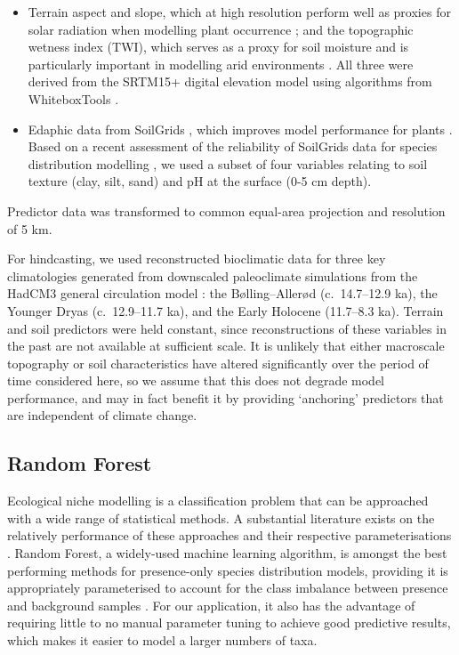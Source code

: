 \documentclass[
  authoryear,
  preprint]{elsarticle}
\providecommand{\tightlist}{%
  \setlength{\itemsep}{0pt}\setlength{\parskip}{0pt}}\usepackage{longtable,booktabs,array}
\begin{document}
\begin{itemize}
\tightlist
\item
  Terrain aspect and slope, which at high resolution perform well as
  proxies for solar radiation when modelling plant occurrence
  \citep{AustinVanNiel2011, LeempoelEtAl2015}; and the topographic
  wetness index (TWI), which serves as a proxy for soil moisture and is
  particularly important in modelling arid environments
  \citep{KopeckyCizkova2010, CamposEtAl2016, DiVirgilioEtAl2018}. All
  three were derived from the SRTM15+ digital elevation model using
  algorithms from WhiteboxTools \citep{Lindsay2016}.
\end{itemize}

\begin{itemize}
\tightlist
\item
  Edaphic data from SoilGrids \citep{HenglEtAl2014, HenglEtAl2017},
  which improves model performance for plants
  \citep{DubuisEtAl2013, ModEtAl2016, VelazcoEtAl2017}. Based on a
  recent assessment of the reliability of SoilGrids data for species
  distribution modelling \citep{MillerEtAl2024}, we used a subset of
  four variables relating to soil texture (clay, silt, sand) and pH at
  the surface (0-5 cm depth).
\end{itemize}

Predictor data was transformed to common equal-area projection and
resolution of 5 km.

For hindcasting, we used reconstructed bioclimatic data for three key
climatologies generated from downscaled paleoclimate simulations from
the HadCM3 general circulation model
\citep{FordhamEtAl2017, BrownEtAl2018}: the Bølling--Allerød
(c.~14.7--12.9 ka), the Younger Dryas (c.~12.9--11.7 ka), and the Early
Holocene (11.7--8.3 ka). Terrain and soil predictors were held constant,
since reconstructions of these variables in the past are not available
at sufficient scale. It is unlikely that either macroscale topography or
soil characteristics have altered significantly over the period of time
considered here, so we assume that this does not degrade model
performance, and may in fact benefit it by providing `anchoring'
predictors that are independent of climate change.

\subsection{Random Forest}\label{random-forest}

Ecological niche modelling is a classification problem that can be
approached with a wide range of statistical methods. A substantial
literature exists on the relatively performance of these approaches and
their respective parameterisations \citep[reviewed
in][]{ValaviEtAl2022}. Random Forest, a widely-used machine learning
algorithm, is amongst the best performing methods for presence-only
species distribution models, providing it is appropriately parameterised
to account for the class imbalance between presence and background
samples \citep{ValaviEtAl2021, ValaviEtAl2022}. For our application, it
also has the advantage of requiring little to no manual parameter tuning
to achieve good predictive results, which makes it easier to model a
larger numbers of taxa.
\end{document}
